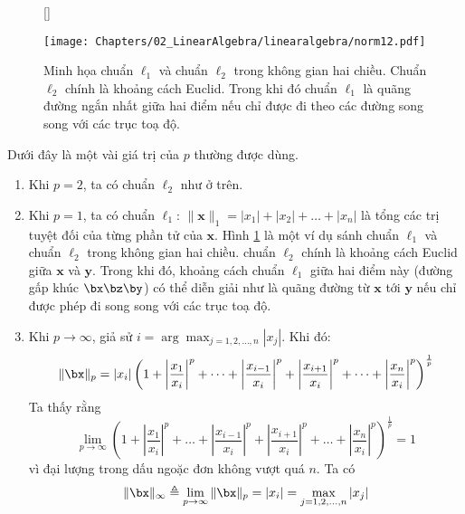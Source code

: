 \begin{figure}[t]
    [\FBwidth]
    {%
    \caption{Minh họa chuẩn $\ell_1$ và chuẩn $\ell_2$ trong không gian hai chiều.
    Chuẩn $\ell_2$ chính
    là khoảng cách Euclid. Trong khi đó chuẩn $\ell_1$ là quãng
    đường ngắn nhất giữa hai điểm nếu chỉ được đi theo các đường song song với
    các trục toạ độ.}
    \label{fig:norm12}}
    { %
    \texttt{[image: Chapters/02\_LinearAlgebra/linearalgebra/norm12.pdf]}
    }
\end{figure}
Dưới đây là một vài giá trị của $p$ thường được dùng.
\begin{enumerate}
    \item Khi $p = 2$, ta có chuẩn $\ell_2$ như ở trên.

    \item Khi $p = 1$, ta có chuẩn $\ell_1$:
    $\|\mathbf{x}\|_1 = |x_1| + |x_2| + \dots +|x_n|$ là tổng các trị tuyệt đối
    của từng phần tử của $\mathbf{x}$. Hình \ref{fig:norm12} là một ví dụ  sánh
    chuẩn $\ell_1$ và chuẩn $\ell_2$ trong không gian hai chiều. chuẩn $\ell_2$
    chính là khoảng cách Euclid giữa $\mathbf{x} $ và
    $\mathbf{y}$. Trong khi đó, khoảng cách chuẩn $\ell_1$ giữa hai điểm này
    (đường gấp khúc $\bx\bz\by$) có thể diễn giải như là quãng đường từ $\mathbf{x}
    $ tới $\mathbf{y}$ nếu chỉ được phép đi song song với các trục toạ độ. 

    \item Khi $p \rightarrow \infty $, giả sử
    $i = \arg\max_{j=1, 2, \dots, n} |x_j|$. Khi đó:
    \begin{equation}
        \|\bx\|_p = |x_i|\left(1 + \left|\frac{x_1}{x_i}\right|^p +
        \dots +
        \left|\frac{x_{i-1}}{x_i}\right|^p + \left|\frac{x_{i+1}}{x_i}\right|^p
        + \dots +\left|\frac{x_{n}}{x_i}\right|^p\right)^{\frac{1}
        {p}}
    \end{equation}
    Ta thấy rằng
    \begin{equation}
        \lim_{p \rightarrow \infty}\left(1 + \left|\frac{x_1}{x_i}\right|^p +
        \dots +
        \left|\frac{x_{i-1}}{x_i}\right|^p + \left|\frac{x_{i+1}}{x_i}\right|^p
        + \dots +\left|\frac{x_{n}}{x_i}\right|^p\right)^{\frac{1}{p}} = 1
    \end{equation}
    vì đại lượng trong dấu ngoặc đơn không vượt quá $n$. Ta có
    \begin{equation}
        \|\bx\|_{\infty} \triangleq \lim_{p \rightarrow \infty} \|\bx\|_{p} =
        |x_i| = \max_{j=1, 2, \dots, n} | x_j|
    \end{equation}

\end{enumerate}

